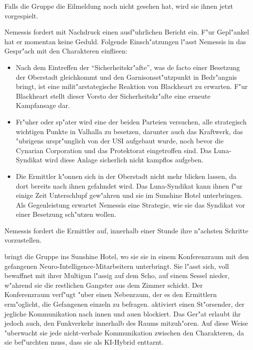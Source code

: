 
Falls die Gruppe die Eilmeldung noch nicht gesehen hat, wird sie ihnen jetzt vorgespielt.


Nemessis fordert mit Nachdruck einen ausf"uhrlichen Bericht ein. F"ur Gepl"ankel hat er momentan keine Geduld. Folgende Einsch"atzungen l"asst Nemessis in das Gespr"ach mit den Charakteren einflie\3en:

\begin{itemize}
	\item Nach dem Eintreffen der ``Sicherheitskr"afte'', was de facto einer Besetzung der Oberstadt gleichkommt und den Garnisonsst"utzpunkt 
		in Bedr"angnis bringt, ist eine milit"arstategische Reaktion von Blackheart zu erwarten. F"ur Blackheart stellt dieser Vorsto\3 der Sicherheitskr"afte eine erneute Kampfansage dar.
	\item Fr"uher oder sp"ater wird eine der beiden Parteien versuchen, alle strategisch wichtigen Punkte in Valhalla zu besetzen, darunter 
		auch das Kraftwerk, das "ubrigens urspr"unglich von der USI aufgebaut wurde, noch bevor die Cynarian Corporation und das Protektorat eingetroffen sind. Das Luna-Syndikat wird diese Anlage sicherlich nicht kampflos aufgeben.
	\item Die Ermittler k"onnen sich in der Oberstadt nicht mehr blicken lassen, da dort bereits nach ihnen gefahndet wird. Das 
		Luna-Syndikat kann ihnen f"ur einige Zeit Unterschlupf gew"ahren und sie im Sunshine Hotel unterbringen. Als Gegenleistung erwartet Nemessis eine Strategie, wie sie das Syndikat vor einer Besetzung sch"utzen wollen.
\end{itemize}

Nemessis fordert die Ermittler auf, innerhalb einer Stunde ihre n"achsten Schritte vorzustellen.


\xl{} bringt die Gruppe ins Sunshine Hotel, wo sie sie in einem Konferenzraum mit den gefangenen Neuro-Intelligence-Mitarbeitern unterbringt. Sie l"asst sich, voll bewaffnet mit ihrer Multigun l"assig auf dem Scho\3, auf einem Sessel nieder, w"ahrend sie die restlichen Gangster aus dem Zimmer schickt. Der Konferenzraum verf"ugt "uber einen Nebenraum, der es den Ermittlern erm"oglicht, die Gefangenen einzeln zu befragen. \xl{} aktiviert einen St"orsender, der jegliche Kommunikation nach innen und au\3en blockiert. Das Ger"at erlaubt ihr jedoch auch, den Funkverkehr innerhalb des Raums mitzuh"oren. Auf diese Weise "uberwacht sie jede nicht-verbale Kommunikation zwischen den Charakteren, da sie bef"urchten muss, dass \ml{} sie als KI-Hybrid enttarnt.


